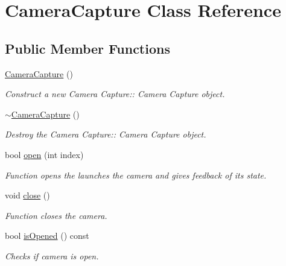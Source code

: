 \hypertarget{classCameraCapture}{}\section{Camera\+Capture Class Reference}
\label{classCameraCapture}
\subsection*{Public Member Functions}
\begin{DoxyCompactItemize}
\item 
\mbox{\label{classCameraCapture_a9dfe4e4bc8dcf369977e6e81f4f438b1}} 
\hyperlink{classCameraCapture_a9dfe4e4bc8dcf369977e6e81f4f438b1}{Camera\+Capture} ()
\begin{DoxyCompactList}\small\item\em Construct a new Camera Capture\+:\+: Camera Capture object. \end{DoxyCompactList}\item 
\mbox{\label{classCameraCapture_a9fb9058c34d463b8bf9055b2f129adac}} 
\hyperlink{classCameraCapture_a9fb9058c34d463b8bf9055b2f129adac}{$\sim$\+Camera\+Capture} ()
\begin{DoxyCompactList}\small\item\em Destroy the Camera Capture\+:\+: Camera Capture object. \end{DoxyCompactList}\item 
bool \hyperlink{classCameraCapture_a1a0212fc06b71d35e613b3c781f0814b}{open} (int index)
\begin{DoxyCompactList}\small\item\em Function opens the launches the camera and gives feedback of its state. \end{DoxyCompactList}\item 
\mbox{\label{classCameraCapture_a452aa68c9cf0f1c46586af54faee7bfe}} 
void \hyperlink{classCameraCapture_a452aa68c9cf0f1c46586af54faee7bfe}{close} ()
\begin{DoxyCompactList}\small\item\em Function closes the camera. \end{DoxyCompactList}\item 
bool \hyperlink{classCameraCapture_af7fbe43ef6352fae2ca2458a60cd8b9f}{is\+Opened} () const
\begin{DoxyCompactList}\small\item\em Checks if camera is open. \end{DoxyCompactList}\item 

\end{DoxyCompactItemize}
